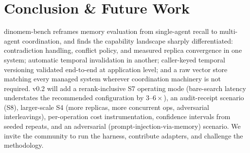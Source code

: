 \documentclass[11pt]{article}
\begin{document}
\section{Conclusion \& Future Work}
dinomem-bench reframes memory evaluation from single-agent recall to multi-agent
coordination, and finds the capability landscape sharply differentiated:
contradiction handling, conflict policy, and measured replica convergence in one
system; automatic temporal invalidation in another; caller-keyed temporal
versioning validated end-to-end at application level; and a raw vector store
matching every managed system wherever coordination machinery is not required.
v0.2 will add a rerank-inclusive S7 operating mode (bare-search latency understates
the recommended configuration by $3$--$6\times$), an audit-receipt scenario (S8),
larger-scale S4 (more replicas, more concurrent ops, adversarial interleavings),
per-operation cost instrumentation, confidence intervals from seeded repeats, and
an adversarial (prompt-injection-via-memory) scenario. We invite the community to
run the harness, contribute adapters, and challenge the methodology.



\end{document}
